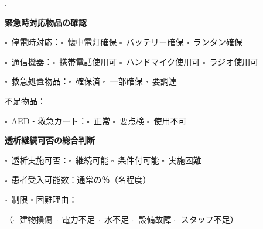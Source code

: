 \documentclass[a4paper,12pt]{jarticle}
\newcommand{\checkbox}{$\square$\ }
\newcommand{\underlinespace}[1]{\underline{\hspace{#1}}}
\begin{document}
. \underlinespace{12cm}

\vspace{8mm}

\begin{center}
\textbf{\large 緊急時対応物品の確認}
\end{center}

\vspace{3mm}

\noindent
\checkbox 停電時対応：\checkbox 懐中電灯確保 \quad \checkbox バッテリー確保 \quad \checkbox ランタン確保

\vspace{3mm}

\noindent
\checkbox 通信機器：\checkbox 携帯電話使用可 \quad \checkbox ハンドマイク使用可 \quad \checkbox ラジオ使用可

\vspace{3mm}

\noindent
\checkbox 救急処置物品：\checkbox 確保済 \quad \checkbox 一部確保 \quad \checkbox 要調達

\vspace{2mm}

\noindent
不足物品：\underlinespace{10cm}

\vspace{3mm}

\noindent
\checkbox AED・救急カート：\checkbox 正常 \quad \checkbox 要点検 \quad \checkbox 使用不可

\vspace{8mm}

\begin{center}
\textbf{\large 透析継続可否の総合判断}
\end{center}

\vspace{3mm}

\noindent
\checkbox 透析実施可否：\checkbox 継続可能 \quad \checkbox 条件付可能 \quad \checkbox 実施困難

\vspace{3mm}

\noindent
\checkbox 患者受入可能数：通常の\underlinespace{2cm}％（\underlinespace{3cm}名程度）

\vspace{3mm}

\noindent
\checkbox 制限・困難理由：

\vspace{2mm}

\noindent
（\checkbox 建物損傷 \quad \checkbox 電力不足 \quad \checkbox 水不足 \quad \checkbox 設備故障 \quad \checkbox スタッフ不足）
\end{document}
